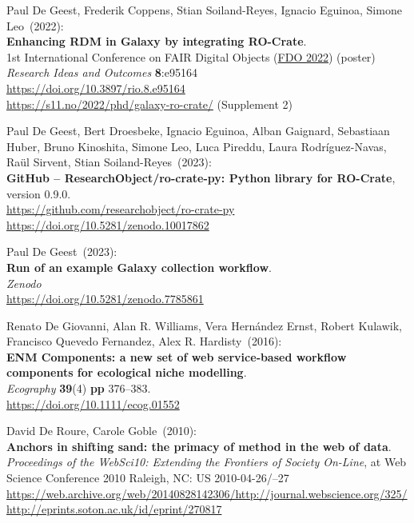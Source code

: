 \begin{thebibliography}{9}
Paul De Geest, Frederik Coppens, Stian Soiland-Reyes, Ignacio Eguinoa, Simone Leo~(2022): \\
\textbf{Enhancing RDM in Galaxy by integrating RO-Crate}.\\
1st International Conference on FAIR Digital Objects
(\href{https://www.fdo2022.org/}{FDO 2022}) (poster)\\
\emph{Research Ideas and Outcomes} \textbf{8}:e95164\\
\url{https://doi.org/10.3897/rio.8.e95164}\\
\url{https://s11.no/2022/phd/galaxy-ro-crate/} (Supplement 2)

Paul De Geest, Bert Droesbeke, Ignacio Eguinoa, Alban Gaignard, Sebastiaan Huber, Bruno Kinoshita, Simone Leo, Luca Pireddu, Laura Rodríguez-Navas, Raül Sirvent, Stian Soiland-Reyes~(2023): \\
\textbf{GitHub -- ResearchObject/ro-crate-py: Python library for RO-Crate}, version 0.9.0.\\
\url{https://github.com/researchobject/ro-crate-py}\\
\url{https://doi.org/10.5281/zenodo.10017862}

Paul De Geest~(2023): \\
\textbf{Run of an example Galaxy collection workflow}.\\
\emph{Zenodo}\\
\url{https://doi.org/10.5281/zenodo.7785861}

Renato De Giovanni, Alan R. Williams, Vera Hernández Ernst, Robert Kulawik, Francisco Quevedo Fernandez, Alex R. Hardisty~(2016): \\
\textbf{ENM Components: a new set of web service‐based workflow components for ecological niche modelling}.\\
\emph{Ecography}
\textbf{39}(4) \textbf{pp} 376--383.\\
\url{https://doi.org/10.1111/ecog.01552}

David De Roure, Carole Goble~(2010): \\
\textbf{Anchors in shifting sand: the primacy of method in the web of data}. \\
\emph{Proceedings of the WebSci10: Extending the Frontiers of Society On-Line},
at Web Science Conference 2010 Raleigh, NC: US 2010-04-26/--27\\
\url{https://web.archive.org/web/20140828142306/http://journal.webscience.org/325/}\\
\url{http://eprints.soton.ac.uk/id/eprint/270817} 


\end{thebibliography}
